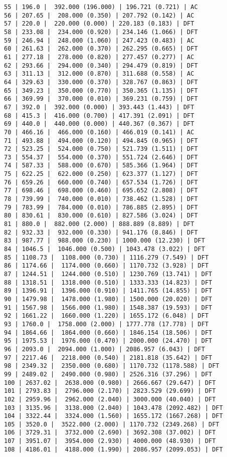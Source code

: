\documentclass[11pt]{article}
\begin{document}
\begin{Verbatim}[commandchars=\\\{\}]
55 | 196.0 |  392.000 (196.000) | 196.721 (0.721) | AC
56 | 207.65 |  208.000 (0.350) | 207.792 (0.142) | AC
57 | 220.0 |  220.000 (0.000) | 220.183 (0.183) | DFT
58 | 233.08 |  234.000 (0.920) | 234.146 (1.066) | DFT
59 | 246.94 |  248.000 (1.060) | 247.423 (0.483) | AC
60 | 261.63 |  262.000 (0.370) | 262.295 (0.665) | DFT
61 | 277.18 |  278.000 (0.820) | 277.457 (0.277) | AC
62 | 293.66 |  294.000 (0.340) | 294.479 (0.819) | DFT
63 | 311.13 |  312.000 (0.870) | 311.688 (0.558) | AC
64 | 329.63 |  330.000 (0.370) | 328.767 (0.863) | DFT
65 | 349.23 |  350.000 (0.770) | 350.365 (1.135) | DFT
66 | 369.99 |  370.000 (0.010) | 369.231 (0.759) | DFT
67 | 392.0 |  392.000 (0.000) | 393.443 (1.443) | DFT
68 | 415.3 |  416.000 (0.700) | 417.391 (2.091) | DFT
69 | 440.0 |  440.000 (0.000) | 440.367 (0.367) | DFT
70 | 466.16 |  466.000 (0.160) | 466.019 (0.141) | AC
71 | 493.88 |  494.000 (0.120) | 494.845 (0.965) | DFT
72 | 523.25 |  524.000 (0.750) | 521.739 (1.511) | DFT
73 | 554.37 |  554.000 (0.370) | 551.724 (2.646) | DFT
74 | 587.33 |  588.000 (0.670) | 585.366 (1.964) | DFT
75 | 622.25 |  622.000 (0.250) | 623.377 (1.127) | DFT
76 | 659.26 |  660.000 (0.740) | 657.534 (1.726) | DFT
77 | 698.46 |  698.000 (0.460) | 695.652 (2.808) | DFT
78 | 739.99 |  740.000 (0.010) | 738.462 (1.528) | DFT
79 | 783.99 |  784.000 (0.010) | 786.885 (2.895) | DFT
80 | 830.61 |  830.000 (0.610) | 827.586 (3.024) | DFT
81 | 880.0 |  882.000 (2.000) | 888.889 (8.889) | DFT
82 | 932.33 |  932.000 (0.330) | 941.176 (8.846) | DFT
83 | 987.77 |  988.000 (0.230) | 1000.000 (12.230) | DFT
84 | 1046.5 |  1046.000 (0.500) | 1043.478 (3.022) | DFT
85 | 1108.73 |  1108.000 (0.730) | 1116.279 (7.549) | DFT
86 | 1174.66 |  1174.000 (0.660) | 1170.732 (3.928) | DFT
87 | 1244.51 |  1244.000 (0.510) | 1230.769 (13.741) | DFT
88 | 1318.51 |  1318.000 (0.510) | 1333.333 (14.823) | DFT
89 | 1396.91 |  1396.000 (0.910) | 1411.765 (14.855) | DFT
90 | 1479.98 |  1478.000 (1.980) | 1500.000 (20.020) | DFT
91 | 1567.98 |  1566.000 (1.980) | 1548.387 (19.593) | DFT
92 | 1661.22 |  1660.000 (1.220) | 1655.172 (6.048) | DFT
93 | 1760.0 |  1758.000 (2.000) | 1777.778 (17.778) | DFT
94 | 1864.66 |  1864.000 (0.660) | 1846.154 (18.506) | DFT
95 | 1975.53 |  1976.000 (0.470) | 2000.000 (24.470) | DFT
96 | 2093.0 |  2094.000 (1.000) | 2086.957 (6.043) | DFT
97 | 2217.46 |  2218.000 (0.540) | 2181.818 (35.642) | DFT
98 | 2349.32 |  2350.000 (0.680) | 1170.732 (1178.588) | DFT
99 | 2489.02 |  2490.000 (0.980) | 2526.316 (37.296) | DFT
100 | 2637.02 |  2638.000 (0.980) | 2666.667 (29.647) | DFT
101 | 2793.83 |  2796.000 (2.170) | 2823.529 (29.699) | DFT
102 | 2959.96 |  2962.000 (2.040) | 3000.000 (40.040) | DFT
103 | 3135.96 |  3138.000 (2.040) | 1043.478 (2092.482) | DFT
104 | 3322.44 |  3324.000 (1.560) | 1655.172 (1667.268) | DFT
105 | 3520.0 |  3522.000 (2.000) | 1170.732 (2349.268) | DFT
106 | 3729.31 |  3732.000 (2.690) | 3692.308 (37.002) | DFT
107 | 3951.07 |  3954.000 (2.930) | 4000.000 (48.930) | DFT
108 | 4186.01 |  4188.000 (1.990) | 2086.957 (2099.053) | DFT
    \end{Verbatim}
\end{document}
